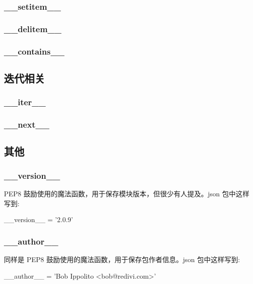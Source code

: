 \subsubsection{\_\_setitem\_\_}
\subsubsection{\_\_delitem\_\_}
\subsubsection{\_\_contains\_\_}

\subsection{迭代相关}
\subsubsection{\_\_iter\_\_}
\subsubsection{\_\_next\_\_}

\subsection{其他}
\subsubsection{\_\_version\_\_}

PEP8 鼓励使用的魔法函数，用于保存模块版本，但很少有人提及。json 包中这样写到:
\begin{python}
__version__ = '2.0.9'
\end{python}

\subsubsection{\_\_author\_\_}

同样是 PEP8 鼓励使用的魔法函数，用于保存包作者信息。json 包中这样写到:
\begin{python}
__author__ = 'Bob Ippolito <bob@redivi.com>'
\end{python}